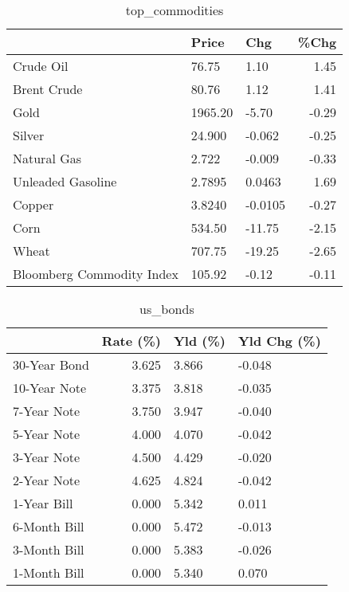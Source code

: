 \documentclass{article}%
\begin{document}
\begin{table}[htbp]%
\caption{top\_commodities}%
\centering%
\begin{adjustbox}{width=1\textwidth}%
\begin{tabular}{lllr}
\toprule
                          &   Price &     Chg &  \%Chg \\
\midrule
               Crude Oil  &   76.75 &    1.10 &  1.45 \\
             Brent Crude  &   80.76 &    1.12 &  1.41 \\
                    Gold  & 1965.20 &   -5.70 & -0.29 \\
                  Silver  &  24.900 &  -0.062 & -0.25 \\
             Natural Gas  &   2.722 &  -0.009 & -0.33 \\
       Unleaded Gasoline  &  2.7895 &  0.0463 &  1.69 \\
                  Copper  &  3.8240 & -0.0105 & -0.27 \\
                    Corn  &  534.50 &  -11.75 & -2.15 \\
                   Wheat  &  707.75 &  -19.25 & -2.65 \\
Bloomberg Commodity Index &  105.92 &   -0.12 & -0.11 \\
\bottomrule
\end{tabular}
%
\end{adjustbox}%
\end{table}

%


\begin{table}[htbp]%
\caption{us\_bonds}%
\centering%
\begin{adjustbox}{width=1\textwidth}%
\begin{tabular}{lrll}
\toprule
             &  Rate (\%) & Yld (\%) & Yld Chg (\%) \\
\midrule
30-Year Bond &     3.625 &   3.866 &      -0.048 \\
10-Year Note &     3.375 &   3.818 &      -0.035 \\
 7-Year Note &     3.750 &   3.947 &      -0.040 \\
 5-Year Note &     4.000 &   4.070 &      -0.042 \\
 3-Year Note &     4.500 &   4.429 &      -0.020 \\
 2-Year Note &     4.625 &   4.824 &      -0.042 \\
 1-Year Bill &     0.000 &   5.342 &       0.011 \\
6-Month Bill &     0.000 &   5.472 &      -0.013 \\
3-Month Bill &     0.000 &   5.383 &      -0.026 \\
1-Month Bill &     0.000 &   5.340 &       0.070 \\
\bottomrule
\end{tabular}
%
\end{adjustbox}%
\end{table}
\end{document}
